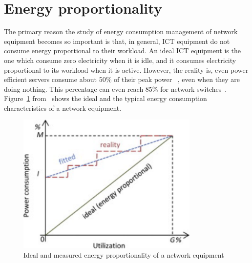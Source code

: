 \section{Energy proportionality}
\label{section:energyproportionality}
The primary reason the study of energy consumption management of network equipment becomes so important is that, in general, ICT equipment do not consume energy proportional to their workload. An ideal ICT equipment is the one which consume zero electricity when it is idle, and it consumes electricity proportional to its workload when it is active. However, the reality is, even power efficient servers consume about 50\% of their peak power ~\cite{DBLP:journals/computer/BarrosoH07}, even when they are doing nothing. This percentage can even reach 85\% for network switches~\cite{DBLP:conf/IEEEcloud/FiandrinoKBZ15}. Figure~\ref{fig:energyproportionality} from~\cite{DBLP:conf/networking/MahadevanSBR09} shows the ideal and the typical energy consumption characteristics of a network equipment. 
\begin{figure}[htb]
	\begin{center}
		\includegraphics[width=9cm]{images/energyproportionality.pdf}
	
		\caption{Ideal and measured energy proportionality of a network equipment~\cite{DBLP:conf/networking/MahadevanSBR09}}
		\label{fig:energyproportionality}
	\end{center}
		\vspace*{-0.5cm}
\end{figure}

